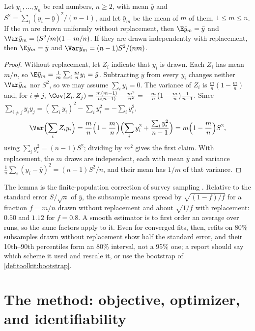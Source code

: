 \begin{refsection}
\begin{lemma}[Subsamples]\label{lem:fitting:subsample}
Let $y_1,\dots,y_n$ be real numbers, $n\ge2$, with mean $\bar y$ and $S^2=\sum_i(y_i-\bar y)^2/(n-1)$, and let $\bar y_m$ be the mean of $m$ of them, $1\le m\le n$. If the $m$ are drawn uniformly without replacement, then $\E\bar y_m=\bar y$ and $\Var\bar y_m=(S^2/m)(1-m/n)$. If they are drawn independently with replacement, then $\E\bar y_m=\bar y$ and $\Var\bar y_m=(n-1)S^2/(nm)$.
\end{lemma}

\begin{proof}
Without replacement, let $Z_i$ indicate that $y_i$ is drawn. Each $Z_i$ has mean $m/n$, so $\E\bar y_m=\frac1m\sum_i\frac mny_i=\bar y$. Subtracting $\bar y$ from every $y_i$ changes neither $\Var\bar y_m$ nor $S^2$, so we may assume $\sum_iy_i=0$. The variance of $Z_i$ is $\frac mn(1-\frac mn)$ and, for $i\ne j$, $\Cov(Z_i,Z_j)=\frac{m(m-1)}{n(n-1)}-\frac{m^2}{n^2}=-\frac mn\bigl(1-\frac mn\bigr)\frac1{n-1}$. Since $\sum_{i\ne j}y_iy_j=(\sum_iy_i)^2-\sum_iy_i^2=-\sum_iy_i^2$,
\[
\Var\Bigl(\sum_iZ_iy_i\Bigr)=\frac mn\Bigl(1-\frac mn\Bigr)\Bigl(\sum_iy_i^2+\frac{\sum_iy_i^2}{n-1}\Bigr)=m\Bigl(1-\frac mn\Bigr)S^2,
\]
using $\sum_iy_i^2=(n-1)S^2$; dividing by $m^2$ gives the first claim. With replacement, the $m$ draws are independent, each with mean $\bar y$ and variance $\frac1n\sum_i(y_i-\bar y)^2=(n-1)S^2/n$, and their mean has $1/m$ of that variance.
\end{proof}

The lemma is the finite-population correction of survey sampling \parencite{Cochran1977}. Relative to the standard error $S/\sqrt n$ of $\bar y$, the subsample means spread by $\sqrt{(1-f)/f}$ for a fraction $f=m/n$ drawn without replacement and about $\sqrt{1/f}$ with replacement: $0.50$ and $1.12$ for $f=0.8$. A smooth estimator is to first order an average over runs, so the same factors apply to it. Even for converged fits, then, refits on 80\% subsamples drawn without replacement show half the standard error, and their 10th--90th percentiles form an 80\% interval, not a 95\% one; a report should say which scheme it used and rescale it, or use the bootstrap of \cref{def:toolkit:bootstrap}.

\section{The method: objective, optimizer, and identifiability}\label{sec:fitting:fitting}


\end{refsection}

